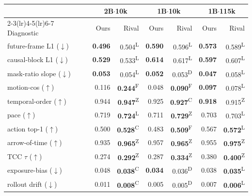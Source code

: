 \documentclass[letterpaper]{article} %
\begin{document}
\begin{table}[!t]
\centering
\small
\setlength{\tabcolsep}{2pt}
\begin{tabular}{lrrrrrr}
\toprule
 & \multicolumn{2}{c}{2B$\cdot$10k} & \multicolumn{2}{c}{1B$\cdot$10k} & \multicolumn{2}{c}{1B$\cdot$115k} \\
\cmidrule(lr){2-3}\cmidrule(lr){4-5}\cmidrule(lr){6-7}
Diagnostic & Ours & Rival & Ours & Rival & Ours & Rival \\
\midrule
future-frame L1 ($\downarrow$) & \textbf{0.496} & 0.504\textsuperscript{L} & \textbf{0.590} & 0.596\textsuperscript{L} & \textbf{0.573} & 0.589\textsuperscript{L} \\
causal-block L1 ($\downarrow$) & \textbf{0.529} & 0.533\textsuperscript{L} & \textbf{0.614} & 0.617\textsuperscript{L} & \textbf{0.597} & 0.607\textsuperscript{L} \\
mask-ratio slope ($\downarrow$) & \textbf{0.053} & 0.054\textsuperscript{L} & \textbf{0.052} & 0.053\textsuperscript{D} & \textbf{0.047} & 0.058\textsuperscript{L} \\
motion-cos ($\uparrow$) & 0.116 & \textbf{0.244}\textsuperscript{F} & 0.048 & \textbf{0.090}\textsuperscript{F} & \textbf{0.097} & 0.078\textsuperscript{L} \\
\midrule
temporal-order ($\uparrow$) & 0.944 & \textbf{0.947}\textsuperscript{Z} & 0.925 & \textbf{0.927}\textsuperscript{C} & \textbf{0.918} & 0.915\textsuperscript{Z} \\
pace ($\uparrow$) & 0.719 & \textbf{0.724}\textsuperscript{L} & 0.711 & \textbf{0.729}\textsuperscript{Z} & 0.703 & 0.703\textsuperscript{L} \\
action top-1 ($\uparrow$) & 0.500 & \textbf{0.528}\textsuperscript{C} & 0.483 & \textbf{0.509}\textsuperscript{F} & 0.567 & \textbf{0.572}\textsuperscript{L} \\
arrow-of-time ($\uparrow$) & 0.935 & \textbf{0.965}\textsuperscript{Z} & 0.957 & \textbf{0.965}\textsuperscript{Z} & 0.955 & \textbf{0.975}\textsuperscript{Z} \\
TCC $\tau$ ($\uparrow$) & 0.274 & \textbf{0.292}\textsuperscript{Z} & 0.287 & \textbf{0.334}\textsuperscript{Z} & 0.380 & \textbf{0.400}\textsuperscript{Z} \\
exposure-bias ($\downarrow$) & 0.048 & \textbf{0.038}\textsuperscript{C} & \textbf{0.034} & 0.036\textsuperscript{D} & 0.038 & \textbf{0.035}\textsuperscript{L} \\
rollout drift ($\downarrow$) & 0.011 & \textbf{0.008}\textsuperscript{C} & 0.005 & 0.005\textsuperscript{D} & 0.007 & \textbf{0.006}\textsuperscript{L} \\

\end{tabular}
\end{table}
\end{document}
